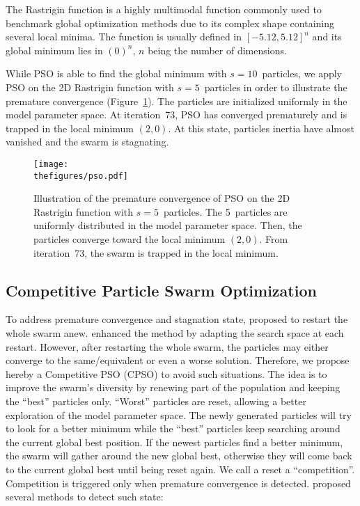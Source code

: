 The Rastrigin function is a highly multimodal function commonly used to benchmark global optimization methods due to its complex shape containing several local minima. The function is usually defined in $\left[ -5.12, 5.12 \right]^{n}$ and its global minimum lies in $\left( 0 \right)^{n}$, $n$ being the number of dimensions.

While PSO is able to find the global minimum with $s = 10$~particles, we apply PSO on the 2D Rastrigin function with $s = 5$~particles in order to illustrate the premature convergence (Figure~\ref{fig:pso}). The particles are initialized uniformly in the model parameter space. At iteration~73, PSO has converged prematurely and is trapped in the local minimum $\left( 2, 0 \right)$. At this state, particles inertia have almost vanished and the swarm is stagnating.

\begin{figure}[!htbp]
	\centering
	\texttt{[image: \\thefigures/pso.pdf]}
    \caption{Illustration of the premature convergence of PSO on the 2D Rastrigin function with $s = 5$~particles. The 5~particles are uniformly distributed in the model parameter space. Then, the particles converge toward the local minimum $\left( 2, 0 \right)$. From iteration~73, the swarm is trapped in the local minimum.}
    \label{fig:pso}
\end{figure}


\subsection{Competitive Particle Swarm Optimization}
\label{ssec:competitive_particle_swarm_optimization}

To address premature convergence and stagnation state, \cite{VanDenBergh2001} proposed to restart the whole swarm anew. \cite{Evers2009} enhanced the method by adapting the search space at each restart. However, after restarting the whole swarm, the particles may either converge to the same/equivalent or even a worse solution. Therefore, we propose hereby a Competitive PSO (CPSO) to avoid such situations. The idea is to improve the swarm's diversity by renewing part of the population and keeping the ``best'' particles only. ``Worst'' particles are reset, allowing a better exploration of the model parameter space. The newly generated particles will try to look for a better minimum while the ``best'' particles keep searching around the current global best position. If the newest particles find a better minimum, the swarm will gather around the new global best, otherwise they will come back to the current global best until being reset again. We call a reset a ``competition''. Competition is triggered only when premature convergence is detected. \cite{VanDenBergh2001} proposed several methods to detect such state:

